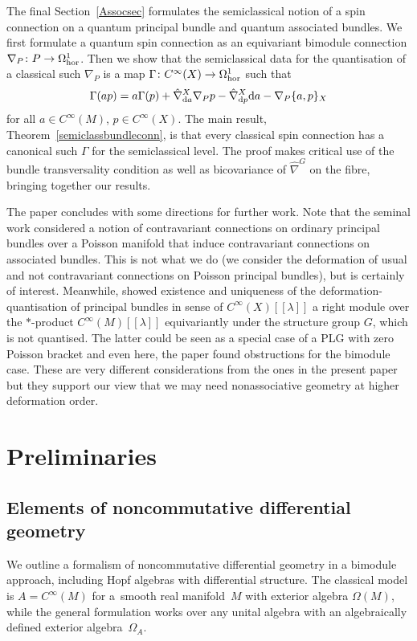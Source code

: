 \documentclass[10pt,a4paper]{amsart}
\numberwithin{equation}{section}
\newcommand{\<}{{\langle}}
\renewcommand{\>}{{\rangle}}
\newcommand{\extd}{{\rm d}}
\begin{document}
The final Section~\ref{Assocsec} formulates the semiclassical notion of a spin connection on a quantum principal bundle and quantum associated bundles. We first formulate a quantum spin connection as an equivariant bimodule connection $\nabla_P\colon P\to \Omega^1_{\rm hor}$. Then we show that the semiclassical data for the quantisation of a classical such $\nabla_P$ is a map $\Gamma\colon C^\infty(X)\to \Omega^1_{\rm hor}$ such that
\[ \Gamma(ap)=a\Gamma(p)+ \hat\nabla^X_{\extd a}\nabla_P p-\hat\nabla^X_{\extd p}\extd a-\nabla_P\{a,p\}_X\]
for all $a\in C^\infty(M)$, $p\in C^\infty(X)$. The main result, Theorem~\ref{semiclassbundleconn}, is that every classical spin connection has a canonical such $\Gamma$ for the semiclassical level. The proof makes critical use of the bundle transversality condition as well as bicovariance of $\hat\nabla^G$ on the fibre, bringing together our results.

The paper concludes with some directions for further work. Note that the seminal work \cite{Fer} considered a notion of contravariant connections on ordinary principal bundles over a Poisson manifold that induce contravariant connections on associated bundles. This is not what we do (we consider the deformation of usual and not contravariant connections on Poisson principal bundles), but is certainly of interest. Meanwhile, \cite{Bor} showed existence and uniqueness of the deformation-quantisation of principal bundles in sense of $C^\infty(X)[[\lambda]]$ a right module over the $*$-product $C^\infty(M)[[\lambda]]$ equivariantly under the structure group $G$, which is not quantised. The latter could be seen as a special case of a PLG with zero Poisson bracket and even here, the paper found obstructions for the bimodule case. These are very different considerations from the ones in the present paper but they support our view that we may need nonassociative geometry at higher deformation order.

\section{Preliminaries}\label{secpre}

\subsection{Elements of noncommutative differential geometry}\label{Omega1}
We outline a formalism of noncommutative differential geometry in a bimodule approach, including Hopf algebras with differential structure. The classical model is $A=C^\infty(M)$ for a~smooth real manifold~$M$ with exterior algebra $\Omega(M)$, while the general formulation works over any unital algebra with an algebraically defined exterior algebra~$\Omega_A$.
\end{document}
